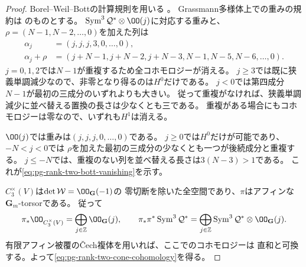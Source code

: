 \begin{proof}
Borel--Weil--Bottの計算規則を用いる
\cite[Theorem~5, p.~3]{PLurieBWB}。
Grassmann多様体上での重みの規約は
\cite[\S2.2, Theorem~2.3, pp.~5--6]{PGuoLuSharpe}のものとする。
$\operatorname{Sym}^3\mathcal Q^*\otimes\OO(j)$に対応する重みと、
$\rho=(N-1,N-2,\ldots,0)$を加えた列は
\begin{equation}
 \begin{aligned}
 \alpha_j&=(j,j,j,3,0,\ldots,0),\\
 \alpha_j+\rho
   &=(j+N-1,j+N-2,j+N-3,N-1,N-5,N-6,\ldots,0).
 \end{aligned}
 \label{eq:pg-rank-two-bott-weights}
\end{equation}
$j=0,1,2$では$N-1$が重複するため全コホモロジーが消える。
$j\ge3$では既に狭義単調減少なので、非零となり得るのは$H^0$だけである。
$j<0$では第四成分$N-1$が最初の三成分のいずれよりも大きい。
従って重複がなければ、狭義単調減少に並べ替える置換の長さは少なくとも三である。
重複がある場合にもコホモロジーは零なので、いずれも$H^1$は消える。

$\OO(j)$では重みは$(j,j,j,0,\ldots,0)$である。
$j\ge0$では$H^0$だけが可能であり、$-N<j<0$では
$\rho$を加えた最初の三成分の少なくとも一つが後続成分と重複する。
$j\le-N$では、重複のない列を並べ替える長さは$3(N-3)>1$である。
これが\eqref{eq:pg-rank-two-bott-vanishing}を示す。

$C_3^\times(V)$は$\det\mathcal W=\OO_{\mathbf G}(-1)$の
零切断を除いた全空間であり、$\pi$はアフィンな$\mathbf G_m$-torsorである。
従って
\begin{equation}
 \pi_*\OO_{C_3^\times(V)}
    =\bigoplus_{j\in\mathbb Z}\OO_{\mathbf G}(j),\qquad
 \pi_*\pi^*\operatorname{Sym}^3\mathcal Q^*
    =\bigoplus_{j\in\mathbb Z}
      \operatorname{Sym}^3\mathcal Q^*\otimes\OO_{\mathbf G}(j).
 \label{eq:pg-rank-two-cone-direct-images}
\end{equation}
有限アフィン被覆の\v{C}ech複体を用いれば、ここでのコホモロジーは
直和と可換する。よって\eqref{eq:pg-rank-two-cone-cohomology}を得る。
\end{proof}

